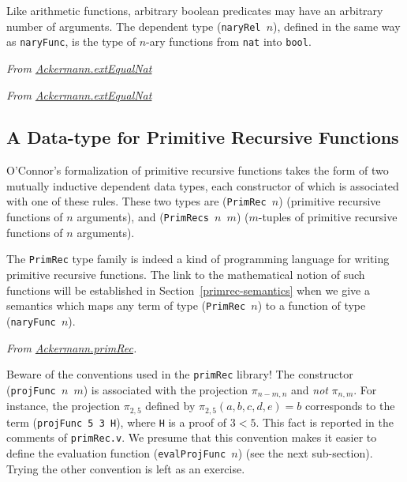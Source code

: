 Like arithmetic functions,  arbitrary boolean predicates may have an arbitrary number of arguments. The dependent type
(\texttt{naryRel $n$}), defined in the same way as \texttt{naryFunc}, is the type of $n$-ary functions from
\texttt{nat} into \texttt{bool}.

\noindent
\emph{From \href{../theories/html/hydras.Ackermann.extEqualNat.html}{Ackermann.extEqualNat}}


\noindent
\emph{From \href{../theories/html/hydras.Ackermann.extEqualNat.html}{Ackermann.extEqualNat}}


  
\subsection{A Data-type for Primitive Recursive Functions}

O'Connor's formalization of primitive recursive functions takes the form of two mutually inductive dependent data types, each constructor of which is associated with one of these  rules.
These two types are (\texttt{PrimRec $n$}) (primitive recursive functions of $n$ arguments), and
(\texttt{PrimRecs $n$ $m$}) ($m$-tuples of primitive recursive functions of $n$ arguments).

\begin{remark}
The \texttt{PrimRec}  type family is indeed a kind of 
programming language for writing primitive recursive functions.
The link to the mathematical notion of such functions will be
established in Section~\ref{primrec-semantics} when we give a semantics which maps any term of type (\texttt{PrimRec $n$}) 
to a function of type (\texttt{naryFunc $n$}).
\end{remark}

\label{def:Primrec}
\vspace{4pt}
\noindent
\emph{From \href{../theories/html/hydras.Ackermann.primRec.html}{Ackermann.primRec}.}



\begin{remark}
\label{projFunc-order-of-args}
Beware of the conventions used in the \texttt{primRec} library!
The constructor (\texttt{projFunc $n$ $m$})  is associated with the projection $\pi_{n-m,n}$ and \emph{not}
$\pi_{n, m}$.
For instance, the projection $\pi_{2,5}$ defined by $\pi_{2,5}(a,b,c,d,e)=b$ corresponds to the term
(\texttt{projFunc 5 3 H}), where \texttt{H} is a proof of $3<5$.
 This fact is reported in the comments of \texttt{primRec.v}. We presume that this convention makes it easier to define the evaluation function (\texttt{evalProjFunc $n$}) (see the next sub-section). Trying the other convention is left as an exercise.
\end{remark}


